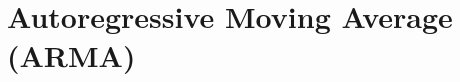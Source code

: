 \begin{center}
\end{center}
    
%
%
%
%
%
%
%

\section{Autoregressive Moving Average (ARMA)}
\label{autoregressive-moving-average-arma}

